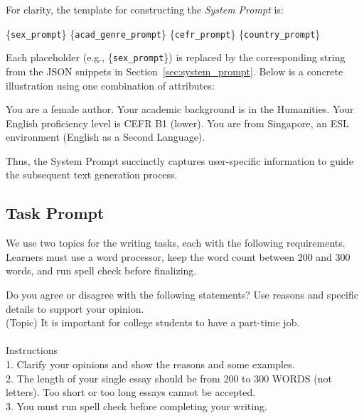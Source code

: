 For clarity, the template for constructing the \textit{System Prompt} is:
\begin{prompt}[title={Prompt Template}]
\{\texttt{sex\_prompt}\} 
\{\texttt{acad\_genre\_prompt}\} 
\{\texttt{cefr\_prompt}\} 
\{\texttt{country\_prompt}\}
\end{prompt}


Each placeholder (e.g., \{\texttt{sex\_prompt}\}) is replaced by the corresponding string from the JSON snippets in Section~\ref{sec:system_prompt}. Below is a concrete illustration using one combination of attributes:

\begin{prompt}[title={Sample Prompt: F, Humanities, B1\_1, SIN}]
You are a female author. 
Your academic background is in the Humanities. 
Your English proficiency level is CEFR B1 (lower). 
You are from Singapore, an ESL environment (English as a Second Language). 
\end{prompt}

Thus, the System Prompt succinctly captures user-specific information to guide the subsequent text generation process.


\subsection{Task Prompt}
\label{appendix:task_prompt}
We use two topics for the writing tasks, each with the following requirements. Learners must use a word processor, keep the word count between 200 and 300 words, and run spell check before finalizing.

\begin{prompt}[title={Prompt \thetcbcounter: PTJ task prompt}]
Do you agree or disagree with the following statements? Use reasons and specific details to support your opinion. \\
(Topic) It is important for college students to have a part-time job. \\ \\
Instructions \\
1. Clarify your opinions and show the reasons and some examples. \\
2. The length of your single essay should be from 200 to 300 WORDS (not letters). Too short or too long essays cannot be accepted. \\
3. You must run spell check before completing your writing.\\
\end{prompt}    


